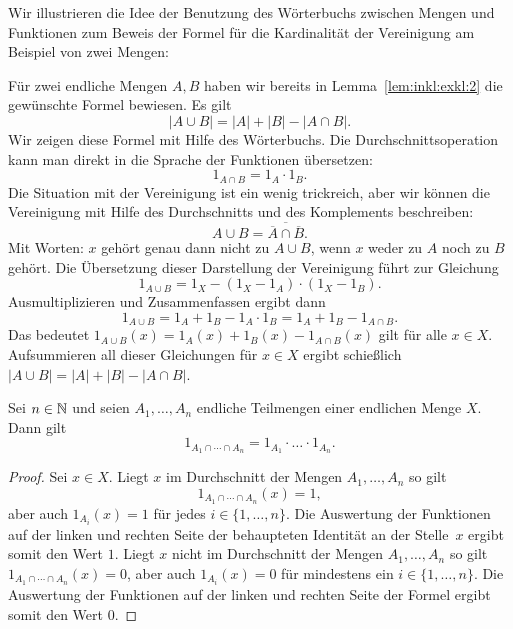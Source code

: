\begin{bem} 
	Wir illustrieren die Idee der Benutzung des Wörterbuchs zwischen Mengen und Funktionen zum Beweis der Formel für die Kardinalität der Vereinigung am Beispiel von zwei Mengen:
	
	Für zwei endliche Mengen $A,B$ haben wir bereits in Lemma~\ref{lem:inkl:exkl:2} die gewünschte Formel bewiesen. Es gilt
	\[
			|A \cup B| = |A| + |B| - |A \cap B|.
	\]
	Wir zeigen diese Formel mit Hilfe des Wörterbuchs. 
	Die Durchschnittsoperation kann man direkt in die Sprache der Funktionen übersetzen: 
	\[	
		1_{A \cap B} = 1_A \cdot 1_B.
	\] 
	Die Situation mit der Vereinigung ist ein wenig trickreich, aber wir können die Vereinigung mit Hilfe des Durchschnitts und des Komplements beschreiben: 
	\[
		A \cup B = \overline{\overline{ A } \cap \overline{B} }.
	\]
	Mit Worten: $x$ gehört genau dann nicht zu $A \cup B$, wenn $x$ weder zu $A$ noch zu $B$ gehört. Die Übersetzung dieser Darstellung der Vereinigung führt zur Gleichung 
	\[
		1_{A \cup B} = 1_X - (1_X - 1_A) \cdot (1_X - 1_B). 
	\]
	Ausmultiplizieren und Zusammenfassen ergibt dann
	\[
		1_{A \cup B} = 1_A + 1_B - 1_A \cdot 1_B = 1_A + 1_B - 1_{A \cap B}.
	\]
	Das bedeutet $1_{A \cup B} (x) = 1_{A}(x) + 1_B(x) - 1_{A \cap B}(x)$ gilt für alle $x \in X$.
	Aufsummieren all dieser Gleichungen für $x \in X$ ergibt schie\ss lich $|A \cup B| = |A| + |B| - |A \cap B|$. 
\end{bem} 

\begin{lem} \label{lem:intersection}
	Sei $n \in \mathbb{N}$ und seien $A_1,\ldots,A_n$ endliche Teilmengen einer endlichen Menge $X$. Dann gilt 
	\[
			1_{A_1 \cap \cdots \cap A_n}  = 1_{A_1} \cdot \ldots \cdot 1_{A_n}. 
	\]
\end{lem} 
\begin{proof}
	Sei $x \in X$. 
	Liegt $x$ im Durchschnitt der Mengen $A_1,\ldots,A_n$ so gilt 
	\[
	1_{A_1 \cap \cdots \cap A_n} (x) =1,
	\]
	aber auch $1_{A_i}(x)=1$ für jedes $i \in \{1,\ldots,n\}$. Die Auswertung der Funktionen auf der linken und rechten Seite der behaupteten Identität an der Stelle~$x$ ergibt somit den Wert $1$.
	Liegt $x$ nicht im Durchschnitt der Mengen $A_1,\ldots,A_n$ so gilt $1_{A_1 \cap \cdots \cap A_n}(x) = 0$, aber auch $1_{A_i}(x)=0$ für mindestens ein $i \in \{1,\ldots,n\}$. Die Auswertung der Funktionen auf der linken und rechten Seite der Formel ergibt somit den Wert $0$. 
\end{proof} 

